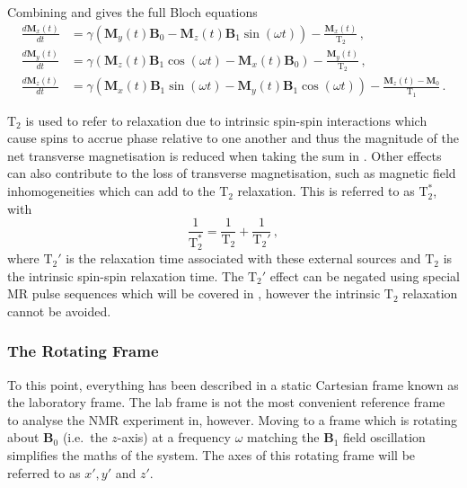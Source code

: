 Combining  and  gives the full Bloch equations
\begin{align}
	\frac{d\mathbf{M}_x(t)}{dt} &= \gamma\left(\mathbf{M}_y(t)\mathbf{B}_0 - \mathbf{M}_z(t)\mathbf{B}_1\sin(\omega t)\right) - \frac{\mathbf{M}_x(t)}{\mathrm{T}_2}\,,\label{eq:bloch_labx}\\
	\frac{d\mathbf{M}_y(t)}{dt} &= \gamma\left(\mathbf{M}_z(t)\mathbf{B}_1\cos(\omega t) - \mathbf{M}_x(t)\mathbf{B}_0\right) - \frac{\mathbf{M}_y(t)}{\mathrm{T}_2}\,,\label{eq:bloch_laby}\\
	\frac{d\mathbf{M}_z(t)}{dt} &= \gamma \left(\mathbf{M}_x(t)\mathbf{B}_1\sin(\omega t) - \mathbf{M}_y(t)\mathbf{B}_1\cos(\omega t) \right) - \frac{\mathbf{M}_z(t) - \mathbf{M}_0}{\mathrm{T}_1}\,. \label{eq:bloch_labz}
\end{align}

$\mathrm{T}_2$ is used to refer to relaxation due to intrinsic spin-spin interactions which cause spins to accrue phase relative to one another and thus the magnitude of the net transverse magnetisation is reduced when taking the sum in  .
Other effects can also contribute to the loss of transverse magnetisation, such as magnetic field inhomogeneities which can add to the $\mathrm{T}_2$ relaxation.
This is referred to as $\mathrm{T}_2^*$, with
\begin{equation}
  \frac{1}{\mathrm{T}_2^*} = \frac{1}{\mathrm{T}_2} + \frac{1}{\mathrm{T}_2'}\,,
  \label{eq:t2star}
\end{equation}
where $\mathrm{T}_2'$ is the relaxation time associated with these external sources and $\mathrm{T}_2$ is the intrinsic spin-spin relaxation time. The $\mathrm{T}_2'$ effect can be negated using special MR pulse sequences which will be covered in , however the intrinsic $\mathrm{T}_2$ relaxation cannot be avoided.  


\subsubsection{The Rotating Frame}
To this point, everything has been described in a static Cartesian frame known as the laboratory frame. 
The lab frame is not the most convenient reference frame to analyse the \ac{NMR} experiment in, however.
Moving to a frame which is rotating about $\mathbf{B}_0$ (i.e.\ the $z$-axis) at a frequency $\omega$ matching the $\mathbf{B}_1$ field oscillation simplifies the maths of the system. 
The axes of this rotating frame will be referred to as $x', y'$ and $z'$. 

